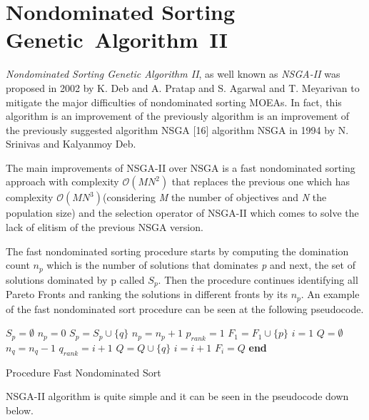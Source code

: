 \section{Nondominated Sorting Genetic~Algorithm~II}
\textit{Nondominated Sorting Genetic Algorithm II}, as well known as \textit{NSGA-II} was proposed in 2002 by K. Deb and A. Pratap and S. Agarwal and T. Meyarivan to mitigate the major difficulties of nondominated sorting MOEAs\cite{996017}. In fact, this algorithm is an improvement of the previously algorithm is an improvement of the previously suggested algorithm NSGA [16] algorithm NSGA\cite{Srinivas1994MuiltiobjectiveOU} in 1994 by N. Srinivas and Kalyanmoy Deb.

The main improvements of NSGA-II over NSGA is a fast nondominated sorting approach with complexity $\mathcal{O}(MN^{2})$ that replaces the previous one which has complexity $\mathcal{O}(MN^{3})$\cite{996017}(considering \textit{M} the number of objectives and \textit{N} the population size) and the selection operator of NSGA-II which comes to solve the lack of elitism of the previous NSGA version. 

The fast nondominated sorting procedure starts by computing the domination count $n_{p}$ which is the number of solutions that dominates \textit{p} and next, the set of solutions dominated by p called \textit{$S_{p}$}. Then the procedure continues identifying all Pareto Fronts and ranking the solutions in different fronts by its $n_{p}$\cite{996017}. An example of the fast nondominated sort procedure can be seen at the following pseudocode.
\begin{algorithm}[H]
\begin{algorithmic}[1]
    \State $S_{p} = \emptyset$
    \State $n_{p} = 0$
            \State $S_{p} = S_{p} \cup \{q\}$
        \Else {}
                \State $n_{p} = n_{p} + 1$
            \EndIf
        \EndIf
    \EndFor
        \State $p_{rank} = 1$
        \State $F_{1} = F_{1} \cup \{p\}$
    \EndIf
\EndFor
\State $i = 1$
    \State $Q = \emptyset$
            \State $n_{q} = n_{q} - 1$
                \State $q_{rank} = i + 1$
                \State $Q = Q \cup \{q\}$
            \EndIf
        \EndFor
    \EndFor
    \State $i = i + 1$
    \State $F_{i} = Q$
\EndWhile
\State \textbf{end}
\end{algorithmic}
\caption{Procedure Fast Nondominated Sort}
\end{algorithm}
NSGA-II algorithm is quite simple and it can be seen in the pseudocode down below.

